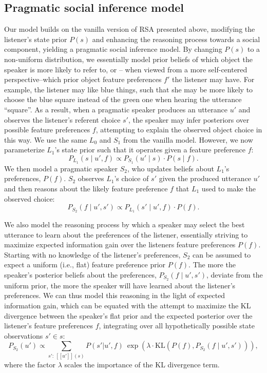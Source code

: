 \documentclass[10pt,a4paper]{article}
\newcommand{\gcs}[1]{\textcolor{blue}{[gcs: #1]}}
\begin{document}
\subsection{Pragmatic social inference model}

Our model builds on the vanilla version of RSA presented above, modifying the listener's state prior $P(s)$ and enhancing the reasoning process towards a social component, yielding a pragmatic social inference model. %
By changing $P(s)$ to a non-uniform distribution, we essentially model prior beliefs of which object the speaker is more likely to refer to, or -- when viewed from a more self-centered perspective--which prior object feature preferences $f'$ the listener may have. 
For example, the listener may like blue things, such that she may be more likely to choose the blue square instead of the green one when hearing the utterance ``square''.
As a result, when a pragmatic speaker produces an utterance $u'$ and observes the listener's referent choice $s'$, the speaker may infer posteriors over possible feature preferences $f$, attempting to explain the observed object choice in this way.
We use the same $L_0$ and $S_1$ from the vanilla model.
However, we now parameterize $L_1$'s state prior such that it operates given a feature preference $f$:
$$P_{L_{1}}(s\mid u',f) \propto P_{S_{1}}(u' \mid s) \cdot P(s \mid f).$$
We then model a pragmatic speaker $S_2$, who updates beliefs about $L_1$'s preferences, $P(f)$.
$S_2$ observes $L_1$'s choice of $s'$ given the produced utterance $u'$ and then reasons about the likely feature preference $f$ that $L_1$ used to make the observed choice:
$$P_{S_{2}}(f\mid u',s') \propto P_{L_{1}}(s'\mid u',f) \cdot P(f).$$

We also model the reasoning process by which a speaker may select the best utterance to learn about the preferences of the listener, essentially striving to maximize expected information gain over the listeners feature preferences $P(f)$.
Starting with no knowledge of the listener's preferences, $S_2$ can be assumed to expect a uniform (i.e., flat) feature preference prior $P(f)$.
The more the speaker's posterior beliefs about the preferences, $P_{S_{2}}(f\mid u',s')$, deviate from the uniform prior, the more the speaker will have learned about the listener's preferences. 
We can thus model this reasoning in the light of expected information gain, which can be equated with the attempt to maximize the KL divergence between the speaker's flat prior and the expected posterior over the listener's feature preferences $f$, integrating over all hypothetically possible state observations $s' \in s$: %
$$P_{S_2}(u') \propto \sum_{s':\  [\![u']\!](s)} P(s'|u',f)\ \exp(\lambda \cdot \textrm{KL}(P(f),P_{S_{2}}(f\mid u',s'))),$$
where the factor $\lambda$ scales the importance of the KL divergence term. 
\end{document}
